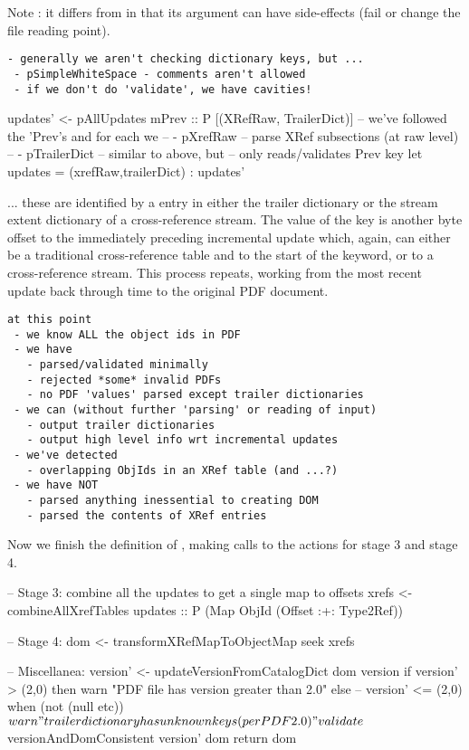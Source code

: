 Note : it differs from  in that
its argument can have side-effects (fail or change the file reading point).

\begin{lstlisting}[style=meta]
 - generally we aren't checking dictionary keys, but ...
 - pSimpleWhiteSpace - comments aren't allowed
 - if we don't do 'validate', we have cavities!
\end{lstlisting}


\begin{code}
    updates' <- pAllUpdates mPrev :: P [(XRefRaw, TrailerDict)]
       -- we've followed the 'Prev's and for each we
       --   - pXrefRaw     -- parse XRef subsections (at raw level)
       --   - pTrailerDict -- similar to above, but
       --                     only reads/validates Prev key
    let updates = (xrefRaw,trailerDict) : updates'
\end{code}

... these are identified by a  entry in either the trailer
dictionary or the stream extent dictionary of a cross-reference stream. The
value of the  key is another byte offset to the immediately
preceding incremental update which, again, can either be a traditional
cross-reference table and to the start of the  keyword, or to a
cross-reference stream. This process repeats, working from the most recent
update back through time to the original PDF document.

\begin{lstlisting}[style=meta]
at this point
 - we know ALL the object ids in PDF
 - we have
   - parsed/validated minimally
   - rejected *some* invalid PDFs
   - no PDF 'values' parsed except trailer dictionaries
 - we can (without further 'parsing' or reading of input)
   - output trailer dictionaries
   - output high level info wrt incremental updates
 - we've detected
   - overlapping ObjIds in an XRef table (and ...?)
 - we have NOT
   - parsed anything inessential to creating DOM
   - parsed the contents of XRef entries
\end{lstlisting}

Now we finish the definition of , making calls
to the actions for stage 3 and stage 4.

\begin{code}  
    -- Stage 3: combine all the updates to get a single map to offsets
    xrefs <- combineAllXrefTables updates
             :: P (Map ObjId (Offset :+: Type2Ref))

    -- Stage 4:
    dom <- transformXRefMapToObjectMap seek xrefs
    
    -- Miscellanea:
    version' <- updateVersionFromCatalogDict dom version
    if version' > (2,0) then
      warn "PDF file has version greater than 2.0"
    else
      -- version' <= (2,0)
      when (not (null etc)) $
        warn "trailer dictionary has unknown keys (per PDF 2.0)"
    validate $
      versionAndDomConsistent version' dom
    return dom
\end{code}

